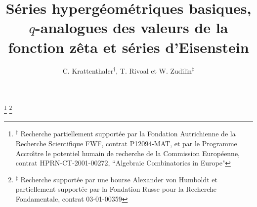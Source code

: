 \documentclass[12pt]{amsart}
\theoremstyle{remark}
\numberwithin{equation}{section}
\begin{document}
\title[]{
S{\'e}ries hyperg{\'e}om{\'e}triques basiques,
$q$-analogues des valeurs de la fonction z{\^e}ta et s{\'e}ries d'Eisenstein}
\author[]{C. Krattenthaler$^\dagger$, T. Rivoal et W. Zudilin$^\ddagger$}

\address{
Institut Girard Desargues,
Universit{\'e} Claude Bernard Lyon-I,
21, avenue Claude Bernard,
F-69622 Villeurbanne Cedex, France}
\address{
Laboratoire de Math{\'e}matiques Nicolas Oresme, CNRS UMR 6139,
Universit{\'e} de Caen,  BP 5186,
14032 Caen cedex,
France}
\address{
Universit{\'e} d'{\'E}tat Lomonosov, Moscou,
Facult{\'e} de M{\'e}canique et Math{\'e}matiques,
Vorobiovy Gory, GSP-2, Moscou 119992 Russie}
\thanks{$^\dagger$ Recherche partiellement support{\'e}e par la Fondation
Autrichienne de la Recherche Scientifique FWF, contrat P12094-MAT,
et par le Programme {\og Accro{\^\i}tre le potentiel humain de recherche \fg}
de la Commission Europ{\'e}enne, contrat HPRN-CT-2001-00272,
``Algebraic Combinatorics in Europe"}
\thanks{$^\ddagger$ Recherche support{\'e}e par une bourse {\og Alexander
von Humboldt \fg} et partiellement support{\'e}e par la Fondation Russe
pour la Recherche Fondamentale, contrat 03-01-00359}


\date{}



\end{document}
